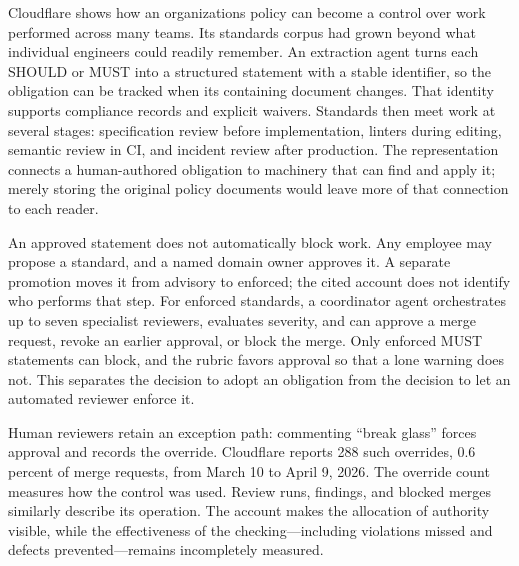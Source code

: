
Cloudflare shows how an organization\textquotesingle s policy can become a control over work performed across many teams. Its standards corpus had grown beyond what individual engineers could readily remember. An extraction agent turns each SHOULD or MUST into a structured statement with a stable identifier, so the obligation can be tracked when its containing document changes\citep{reimann2026codex}. That identity supports compliance records and explicit waivers. Standards then meet work at several stages: specification review before implementation, linters during editing, semantic review in CI, and incident review after production. The representation connects a human-authored obligation to machinery that can find and apply it; merely storing the original policy documents would leave more of that connection to each reader.


An approved statement does not automatically block work. Any employee may propose a standard, and a named domain owner approves it. A separate promotion moves it from advisory to enforced; the cited account does not identify who performs that step. For enforced standards, a coordinator agent orchestrates up to seven specialist reviewers, evaluates severity, and can approve a merge request, revoke an earlier approval, or block the merge. Only enforced MUST statements can block, and the rubric favors approval so that a lone warning does not\citep{skidmore2026review}. This separates the decision to adopt an obligation from the decision to let an automated reviewer enforce it.

Human reviewers retain an exception path: commenting ``break glass'' forces approval and records the override. Cloudflare reports 288 such overrides, 0.6 percent of merge requests, from March 10 to April 9, 2026\citep{skidmore2026review}. The override count measures how the control was used. Review runs, findings, and blocked merges similarly describe its operation. The account makes the allocation of authority visible, while the effectiveness of the checking—including violations missed and defects prevented—remains incompletely measured.

